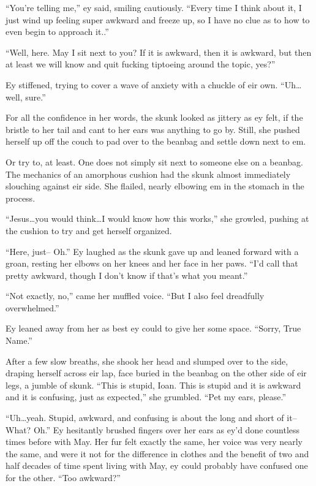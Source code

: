 ``You're telling me,'' ey said, smiling cautiously. ``Every time I think about it, I just wind up feeling super awkward and freeze up, so I have no clue as to how to even begin to approach it..''

``Well, here. May I sit next to you? If it is awkward, then it is awkward, but then at least we will know and quit fucking tiptoeing around the topic, yes?''

Ey stiffened, trying to cover a wave of anxiety with a chuckle of eir own. ``Uh\ldots well, sure.''

For all the confidence in her words, the skunk looked as jittery as ey felt, if the bristle to her tail and cant to her ears was anything to go by. Still, she pushed herself up off the couch to pad over to the beanbag and settle down next to em.

Or try to, at least. One does not simply sit next to someone else on a beanbag. The mechanics of an amorphous cushion had the skunk almost immediately slouching against eir side. She flailed, nearly elbowing em in the stomach in the process.

``Jesus\ldots you would think\ldots I would know how this works,'' she growled, pushing at the cushion to try and get herself organized.

``Here, just-- Oh.'' Ey laughed as the skunk gave up and leaned forward with a groan, resting her elbows on her knees and her face in her paws. ``I'd call that pretty awkward, though I don't know if that's what you meant.''

``Not exactly, no,'' came her muffled voice. ``But I also feel dreadfully overwhelmed.''

Ey leaned away from her as best ey could to give her some space. ``Sorry, True Name.''

After a few slow breaths, she shook her head and slumped over to the side, draping herself across eir lap, face buried in the beanbag on the other side of eir legs, a jumble of skunk. ``This is stupid, Ioan. This is stupid and it is awkward and it is confusing, just as expected,'' she grumbled. ``Pet my ears, please.''

``Uh\ldots yeah. Stupid, awkward, and confusing is about the long and short of it-- What? Oh.'' Ey hesitantly brushed fingers over her ears as ey'd done countless times before with May. Her fur felt exactly the same, her voice was very nearly the same, and were it not for the difference in clothes and the benefit of two and half decades of time spent living with May, ey could probably have confused one for the other. ``Too awkward?''

